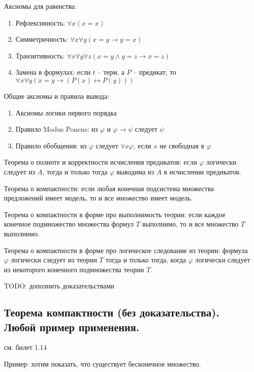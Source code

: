 \documentclass[a4paper, 10pt]{article}
\begin{document}
Аксиомы для равенства:

\begin{enumerate}
    \item Рефлексивность: $\forall x (x=x)$
    \item Симметричность: $\forall x \forall y (x=y \to y=x)$
    \item Транзитивность: $\forall x\forall y\forall z (x=y\land y=z \to x=z)$
    \item Замена в формулах: если $t$ -- терм, а $P$ -- предикат, то $\forall x\forall y (x=y \to (P(x)\leftrightarrow P(y)))$
\end{enumerate}

Общие аксиомы и правила вывода:

\begin{enumerate}
    \item Аксиомы логики первого порядка
    \item Правило Modus Ponens: из $\varphi$ и $\varphi\to\psi$ следует $\psi$
    \item Правило обобщения: из $\varphi$ следует $\forall x\varphi$, если $x$ не свободная в $\varphi$
\end{enumerate}

Теорема о полноте и корректности исчисления предикатов: если $\varphi$ логически следует из $A$, тогда и только тогда $\varphi$ выводима из $A$ в исчислении предикатов.

\hfill

Теорема о компактности: если любая конечная подсистема множества предложений имеет модель, то и все множество имеет модель.

Теорема о компактности в форме про выполнимость теории: если каждое конечное подмножество множества формул $T$ выполнимо, то и все множество $T$ выполнимо.

Теорема о компактности в форме про логическое следование из теории: формула $\varphi$ логически следует из теории $T$ тогда и только тогда, когда $\varphi$ логически следует из некоторого конечного подмножества теории $T$.

TODO: дополнить доказательствами

\subsection{Теорема компактности (без доказательства). Любой пример применения.}

см. билет 1.14

Пример: хотим показать, что существует бесконечное множество.
\end{document}

